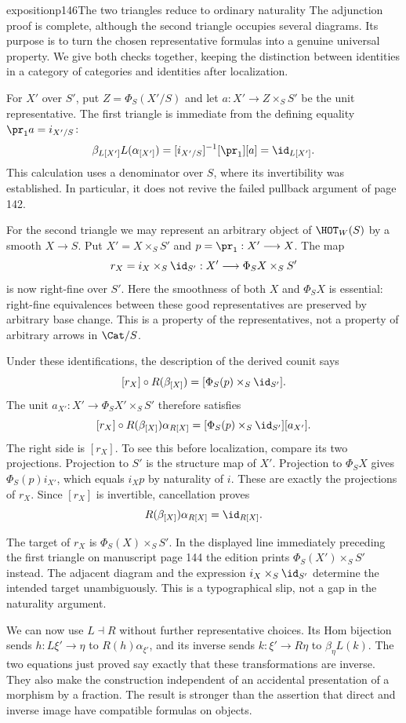 \begin{dcomment}{exposition}{p146}{The two triangles reduce to ordinary naturality}
The adjunction proof is complete, although the second triangle occupies several diagrams. Its purpose is to turn the chosen representative formulas into a genuine universal property. We give both checks together, keeping the distinction between identities in a category of categories and identities after localization.

For $X'$ over $S'$, put $Z=\Phi_S(X'/S)$ and let $a:X'\longrightarrow Z\times_SS'$ be the unit representative. The first triangle is immediate from the defining equality $\pr_1a=i_{X'/S}$:
\[
 \beta_{L[X']}L(\alpha_{[X']})
 =[i_{X'/S}]^{-1}[\pr_1][a]=\id_{L[X']}.
\]
This calculation uses a denominator over $S$, where its invertibility was established. In particular, it does not revive the failed pullback argument of page 142.

For the second triangle we may represent an arbitrary object of $\HOT_W(S)$ by a smooth $X\longrightarrow S$. Put $X'=X\times_SS'$ and $p=\pr_1:X'\longrightarrow X$. The map
\[
 r_X=i_X\times_S\id_{S'}:
 X'\longrightarrow\Phi_SX\times_SS'
\]
is now right-fine over $S'$. Here the smoothness of both $X$ and $\Phi_SX$ is essential: right-fine equivalences between these good representatives are preserved by arbitrary base change. This is a property of the representatives, not a property of arbitrary arrows in $\Cat/S$.

Under these identifications, the description of the derived counit says
\[
 [r_X]\circ R(\beta_{[X]})
 =[\Phi_S(p)\times_S\id_{S'}].
\]
The unit $a_{X'}:X'\longrightarrow\Phi_SX'\times_SS'$ therefore satisfies
\[
 [r_X]\circ R(\beta_{[X]})\alpha_{R[X]}
 =[\Phi_S(p)\times_S\id_{S'}][a_{X'}].
\]
The right side is $[r_X]$. To see this before localization, compare its two projections. Projection to $S'$ is the structure map of $X'$. Projection to $\Phi_SX$ gives $\Phi_S(p)i_{X'}$, which equals $i_Xp$ by naturality of $i$. These are exactly the projections of $r_X$. Since $[r_X]$ is invertible, cancellation proves
\[
 R(\beta_{[X]})\alpha_{R[X]}=\id_{R[X]}.
\]

The target of $r_X$ is $\Phi_S(X)\times_SS'$. In the displayed line immediately preceding the first triangle on manuscript page 144 the edition prints $\Phi_S(X')\times_SS'$ instead. The adjacent diagram and the expression $i_X\times_S\id_{S'}$ determine the intended target unambiguously. This is a typographical slip, not a gap in the naturality argument.

We can now use $L\dashv R$ without further representative choices. Its Hom bijection sends $h:L\xi'\longrightarrow\eta$ to $R(h)\alpha_{\xi'}$, and its inverse sends $k:\xi'\longrightarrow R\eta$ to $\beta_\eta L(k)$. The two equations just proved say exactly that these transformations are inverse. They also make the construction independent of an accidental presentation of a morphism by a fraction. The result is stronger than the assertion that direct and inverse image have compatible formulas on objects.
\end{dcomment}

